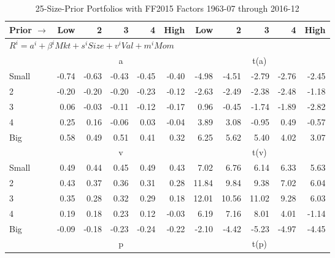 
\begin{table}[!ht]
\centering
\caption{25-Size-Prior Portfolios with FF2015 Factors 1963-07 through 2016-12}
\begin{tabular}{lrrrrrrrrrr}
  \toprule
    Prior $\rightarrow$ & Low & 2 & 3 & 4 & High & Low & 2 & 3 & 4 & High \\ 
  \midrule
  \multicolumn{11}{l}{$R^i=a^i+\beta^iMkt+s^iSize+v^iVal+m^iMom$} \\

  
    
      & \multicolumn{5}{c}{a} & \multicolumn{5}{c}{t(a)}
    
    \\
      \cmidrule(r){2-6} \cmidrule(r){7-11}

    Small   & -0.74  & -0.63  & -0.43  & -0.45  & -0.40  & -4.98  & -4.51  & -2.79  & -2.76  & -2.45  \\
         2  & -0.20  & -0.20  & -0.20  & -0.23  & -0.12  & -2.63  & -2.49  & -2.38  & -2.48  & -1.18  \\
         3  & 0.06  & -0.03  & -0.11  & -0.12  & -0.17  & 0.96  & -0.45  & -1.74  & -1.89  & -2.82  \\
         4  & 0.25  & 0.16  & -0.06  & 0.03  & -0.04  & 3.89  & 3.08  & -0.95  & 0.49  & -0.57  \\
    Big     & 0.58  & 0.49  & 0.51  & 0.41  & 0.32  & 6.25  & 5.62  & 5.40  & 4.02  & 3.07  \\

  
    
      & \multicolumn{5}{c}{v} & \multicolumn{5}{c}{t(v)}
    
    \\
      \cmidrule(r){2-6} \cmidrule(r){7-11}

    Small   & 0.49  & 0.44  & 0.45  & 0.49  & 0.43  & 7.02  & 6.76  & 6.14  & 6.33  & 5.63  \\
         2  & 0.43  & 0.37  & 0.36  & 0.31  & 0.28  & 11.84  & 9.84  & 9.38  & 7.02  & 6.04  \\
         3  & 0.35  & 0.28  & 0.32  & 0.29  & 0.18  & 12.01  & 10.56  & 11.02  & 9.28  & 6.03  \\
         4  & 0.19  & 0.18  & 0.23  & 0.12  & -0.03  & 6.19  & 7.16  & 8.01  & 4.01  & -1.14  \\
    Big     & -0.09  & -0.18  & -0.23  & -0.24  & -0.22  & -2.10  & -4.42  & -5.23  & -4.97  & -4.45  \\

  
    
      & \multicolumn{5}{c}{p} & \multicolumn{5}{c}{t(p)}
    

\end{tabular}
\end{table}
